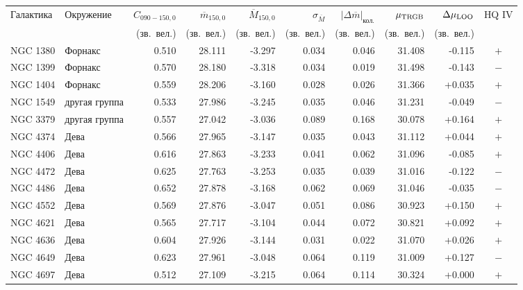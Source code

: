 \begin{tabular}{llrrrrrrrc}
\toprule
Галактика & Окружение & $C_{090-150,0}$ & $\overline m_{150,0}$ &
$\overline M_{150,0}$ & $\sigma_{\overline M}$ & $|\Delta\overline m|_{\text{кол.}}$ &
$\mu_{\rm TRGB}$ & $\Delta\mu_{\rm LOO}$ & HQ IV \\
 & & (зв.\ вел.) & (зв.\ вел.) & (зв.\ вел.) &
(зв.\ вел.) & (зв.\ вел.) & (зв.\ вел.) & (зв.\ вел.) & \\
\midrule
NGC 1380 & Форнакс & 0.510 & 28.111 & -3.297 & 0.034 & 0.046 & 31.408 & -0.115 & $+$ \\
NGC 1399 & Форнакс & 0.570 & 28.180 & -3.318 & 0.034 & 0.019 & 31.498 & -0.143 & $-$ \\
NGC 1404 & Форнакс & 0.559 & 28.206 & -3.160 & 0.028 & 0.026 & 31.366 & +0.035 & $+$ \\
NGC 1549 & другая группа & 0.533 & 27.986 & -3.245 & 0.035 & 0.046 & 31.231 & -0.049 & $-$ \\
NGC 3379 & другая группа & 0.557 & 27.042 & -3.036 & 0.089 & 0.168 & 30.078 & +0.164 & $+$ \\
NGC 4374 & Дева & 0.566 & 27.965 & -3.147 & 0.035 & 0.043 & 31.112 & +0.044 & $+$ \\
NGC 4406 & Дева & 0.616 & 27.863 & -3.233 & 0.041 & 0.062 & 31.096 & -0.085 & $+$ \\
NGC 4472 & Дева & 0.625 & 27.763 & -3.253 & 0.035 & 0.039 & 31.016 & -0.122 & $-$ \\
NGC 4486 & Дева & 0.652 & 27.878 & -3.168 & 0.062 & 0.069 & 31.046 & -0.035 & $-$ \\
NGC 4552 & Дева & 0.569 & 27.876 & -3.047 & 0.051 & 0.086 & 30.923 & +0.150 & $+$ \\
NGC 4621 & Дева & 0.565 & 27.717 & -3.104 & 0.044 & 0.072 & 30.821 & +0.092 & $+$ \\
NGC 4636 & Дева & 0.604 & 27.926 & -3.144 & 0.031 & 0.022 & 31.070 & +0.026 & $+$ \\
NGC 4649 & Дева & 0.623 & 27.961 & -3.048 & 0.064 & 0.119 & 31.009 & +0.127 & $-$ \\
NGC 4697 & Дева & 0.512 & 27.109 & -3.215 & 0.064 & 0.114 & 30.324 & +0.000 & $+$ \\
\bottomrule
\end{tabular}

